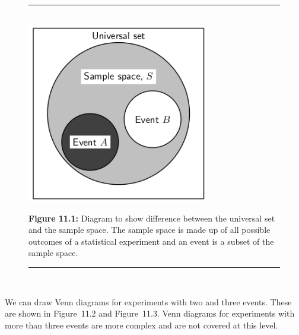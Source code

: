     \setcounter{subfigure}{0}


	\begin{figure}[H] %
    \begin{center}
    \rule[.1in]{\figurerulewidth}{.005in} \\
        \label{m39377*uid12!!!underscore!!!media}\label{m39377*uid12!!!underscore!!!printimage}\includegraphics[width=300px]{col11306.imgs/m39377_MG10C17_001.png} %
        
      \vspace{2pt}
    \vspace{\rubberspace}\par \begin{cnxcaption}
	  \small \textbf{Figure 11.1: }Diagram to show difference between the universal set and
the sample space. The sample space is made up of all possible outcomes of a
statistical experiment and an event is a subset of the sample space.
	\end{cnxcaption}
      
    \vspace{.1in}
    \rule[.1in]{\figurerulewidth}{.005in} \\
        
    \end{center}

 \end{figure}   

    \addtocounter{footnote}{-0}
    
          \label{m39377*eip-451}We can draw Venn diagrams for experiments with two and three events. These are shown in Figure~11.2 and Figure~11.3. Venn diagrams for experiments with more than three events are more complex and are not covered at this level. \par 

